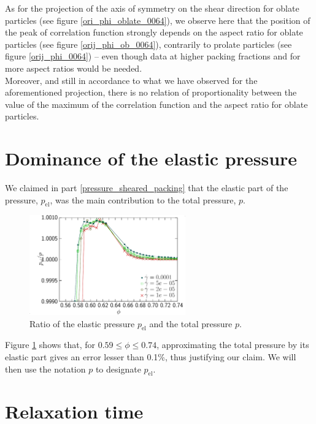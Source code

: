 \documentclass[class=report, float=false, crop=false]{standalone}
\begin{document}
As for the projection of the axis of symmetry on the shear direction for oblate particles (see figure \ref{ori_phi_oblate_0064}), we observe here that the position of the peak of correlation function strongly depends on the aspect ratio for oblate particles (see figure \ref{orij_phi_ob_0064}), contrarily to prolate particles (see figure \ref{orij_phi_0064}) -- even though data at higher packing fractions and for more aspect ratios would be needed.\\

Moreover, and still in accordance to what we have observed for the aforementioned projection, there is no relation of proportionality between the value of the maximum of the correlation function and the aspect ratio for oblate particles.

\section{Dominance of the elastic pressure}

We claimed in part \ref{pressure_sheared_packing} that the elastic part of the pressure, $p_{\text{el}}$, was the main contribution to the total pressure, $p$.

\begin{figure}[h!]
\centering
\includegraphics[width=0.6\textwidth]{figures/figs/pe_ptot-zoom-phi}
\caption{Ratio of the elastic pressure $p_{\text{el}}$ and the total pressure $p$.}
\label{pe_ptot-zoom-phi}
\end{figure}

Figure \ref{pe_ptot-zoom-phi} shows that, for $0.59\le\phi\le0.74$, approximating the total pressure by its elastic part gives an error lesser than 0.1\%, thus justifying our claim. We will then use the notation $p$ to designate $p_{\text{el}}$.

\section{Relaxation time}
\end{document}
